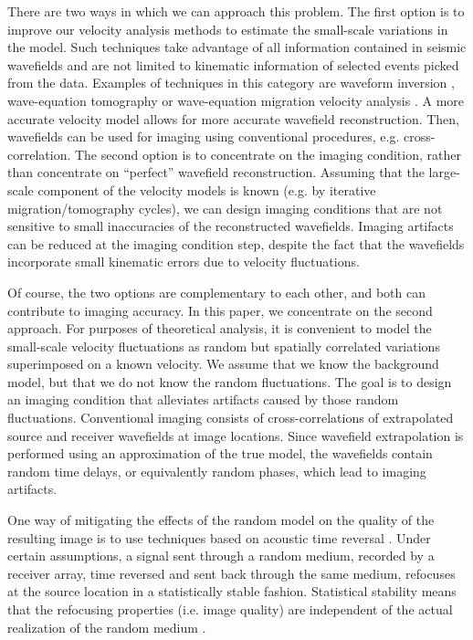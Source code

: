 There are two ways in which we can approach this problem. The first
option is to improve our velocity analysis methods to estimate the
small-scale variations in the model. Such techniques take advantage of
all information contained in seismic wavefields and are not limited to
kinematic information of selected events picked from the
data. Examples of techniques in this category are waveform inversion
\cite[]{tarantola.elsevier,GPR38-03-02870310,GPR38-03-03110312,GEO69-01-02310248},
wave-equation tomography \cite[]{GEO57-01-00150026} or wave-equation
migration velocity analysis
\cite[]{SavaBiondi.gp.wemva1,SavaBiondi.gp.wemva2,Shen:2005}. A more
accurate velocity model allows for more accurate wavefield
reconstruction. Then, wavefields can be used for imaging using
conventional procedures, e.g. cross-correlation.  The second option is
to concentrate on the imaging condition, rather than concentrate on
``perfect'' wavefield reconstruction. Assuming that the large-scale
component of the velocity models is known (e.g. by iterative
migration/tomography cycles), we can design imaging conditions that
are not sensitive to small inaccuracies of the reconstructed
wavefields. Imaging artifacts can be reduced at the imaging condition
step, despite the fact that the wavefields incorporate small kinematic
errors due to velocity fluctuations.

Of course, the two options are complementary to each other, and both
can contribute to imaging accuracy. In this paper, we concentrate on
the second approach. For purposes of theoretical analysis, it is
convenient to model the small-scale velocity fluctuations as random
but spatially correlated variations superimposed on a known
velocity. We assume that we know the background model, but that we do
not know the random fluctuations. The goal is to design an imaging
condition that alleviates artifacts caused by those random
fluctuations. Conventional imaging consists of cross-correlations of
extrapolated source and receiver wavefields at image locations. Since
wavefield extrapolation is performed using an approximation of the
true model, the wavefields contain random time delays, or equivalently
random phases, which lead to imaging artifacts.

One way of mitigating the effects of the random model on the quality
of the resulting image is to use techniques based on acoustic time
reversal \cite[]{Fink:1999}. Under certain assumptions, a signal sent
through a random medium, recorded by a receiver array, time reversed
and sent back through the same medium, refocuses at the source
location in a statistically stable fashion. Statistical stability
means that the refocusing properties (i.e. image quality) are
independent of the actual realization of the random medium
\cite[]{Papanicolaou:2004,Fouque:2005}.

